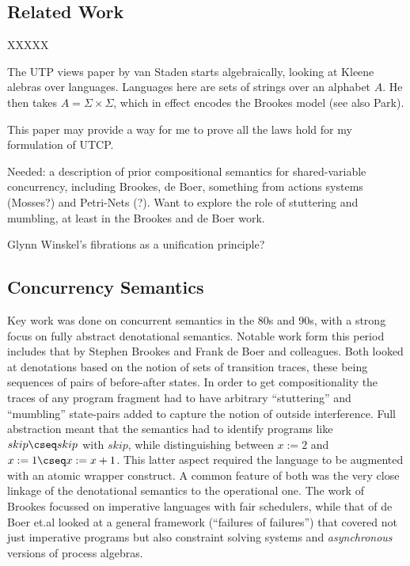 \subsection{Related Work}\label{ssec:related}

\newpage
XXXXX

The UTP views paper by van Staden\cite{DBLP:conf/utp/Staden14}
starts algebraically, looking at Kleene alebras over languages.
Languages here are sets of strings over an alphabet $A$.
He then takes $A =\Sigma\times\Sigma$,
which in effect encodes the Brookes model\cite{DBLP:journals/iandc/Brookes96}
(see also Park\cite{conf/ac/Park79}).

This paper may provide a way for me to prove all the laws hold for
my formulation of UTCP.


Needed: a description of prior compositional semantics
for shared-variable concurrency,
including Brookes, de Boer, something from actions systems (Mosses?)
and Petri-Nets (?).
Want to explore the role of stuttering and mumbling,
at least in the Brookes and de Boer work.

Glynn Winskel's fibrations as a unification principle?


\subsection{Concurrency Semantics}

Key work was done on concurrent semantics in the 80s and 90s,
with a strong focus on fully abstract denotational
semantics.
Notable work form this period includes that by
Stephen Brookes\cite{DBLP:journals/iandc/Brookes96}
and Frank de Boer and colleagues\cite{DBLP:conf/concur/BoerKPR91}.
Both looked at denotations based on the notion of sets of transition traces,
these being sequences of pairs of before-after states.
In order to get compositionality the traces of any program fragment
had to have arbitrary ``stuttering'' and ``mumbling'' state-pairs
added to capture the notion of outside interference.
Full abstraction meant that the semantics had to identify
programs like $skip\cseq skip$ with $skip$,
while distinguishing between $x:=2$ and $x:=1\cseq x:=x+1$.
This latter aspect required the language to be augmented with
an atomic wrapper construct.
A common feature of both was the very close linkage of the denotational
semantics to the operational one.
The work of Brookes\cite{DBLP:journals/iandc/Brookes96}
focussed on imperative languages with fair schedulers,
while that of de Boer et.al\cite{DBLP:conf/concur/BoerKPR91}
looked at a general framework (``failures of failures'')
that covered not just imperative programs
but also constraint solving systems
and \emph{asynchronous} versions of process algebras.


